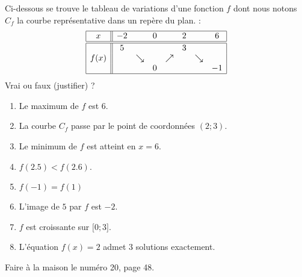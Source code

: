 
\begin{exercice}\label{exosmath-0549}

    Ci-dessous se trouve le tableau de variations d'une fonction \( f\) dont nous notons \( C_f\) la courbe représentative dans un repère du plan. :
    \begin{equation*}
        \begin{array}[]{|c||ccccccc|}
            \hline
            x&-2&&0&&2&&6\\
            \hline\hline
            &5&&&&3&&\\
            f(x)&&\searrow&&\nearrow&&\searrow&\\
            &&&0&&&&-1\\
            \hline
        \end{array}
    \end{equation*}
    Vrai ou faux (justifier) ?
    \begin{enumerate}
        \item
            Le maximum de $f$ est \( 6\).
        \item
            La courbe \( C_f\) passe par le point de coordonnées \( (2;3)\).
        \item
            Le minimum de \( f\) est atteint en \( x=6\).
        \item
            \( f(2.5)<f(2.6)\).
        \item
            \( f(-1)=f(1)\)
        \item
            L'image de \( 5\) par \( f\) est \( -2\).
        \item
            \( f\) est croissante sur \( \mathopen[ 0 ; 3 \mathclose]\).
        \item
            L'équation \( f(x)=2\) admet \( 3\) solutions exactement.
    \end{enumerate}

    Faire à la maison le numéro 20, page 48.

\end{exercice}
